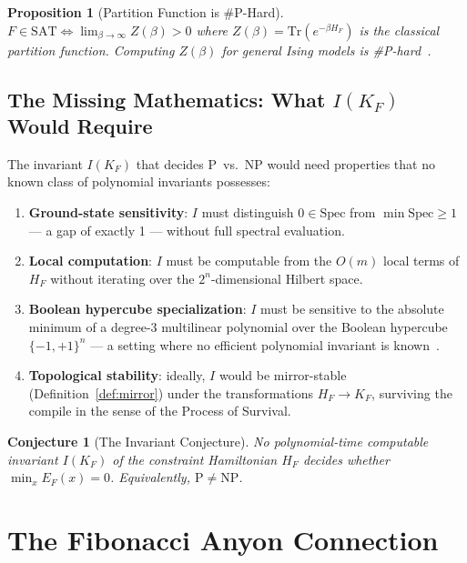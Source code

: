 \documentclass[11pt,letterpaper]{article}
\newtheorem{proposition}[theorem]{Proposition}
\newtheorem{conjecture}[theorem]{Conjecture}
\begin{document}
\begin{proposition}[Partition Function is \#P-Hard]
$F \in \mathrm{SAT} \iff \lim_{\beta \to \infty} Z(\beta) > 0$ where
$Z(\beta) = \mathrm{Tr}(e^{-\beta H_F})$ is the classical partition function.
Computing $Z(\beta)$ for general Ising models is \#P-hard~\cite{jerrum1993}.
\end{proposition}

\subsection{The Missing Mathematics: What $I(K_F)$ Would Require}

The invariant $I(K_F)$ that decides P~vs.~NP would need properties that no
known class of polynomial invariants possesses:

\begin{enumerate}
\item \textbf{Ground-state sensitivity}: $I$ must distinguish $0 \in \mathrm{Spec}$
  from $\min \mathrm{Spec} \geq 1$ --- a gap of exactly 1 --- without full
  spectral evaluation.
\item \textbf{Local computation}: $I$ must be computable from the $O(m)$
  local terms of $H_F$ without iterating over the $2^n$-dimensional Hilbert space.
\item \textbf{Boolean hypercube specialization}: $I$ must be sensitive to
  the absolute minimum of a degree-3 multilinear polynomial over the
  Boolean hypercube $\{-1,+1\}^n$ --- a setting where no efficient
  polynomial invariant is known~\cite{razborov1992}.
\item \textbf{Topological stability}: ideally, $I$ would be mirror-stable
  (Definition~\ref{def:mirror}) under the transformations $H_F \to K_F$,
  surviving the compile in the sense of the Process of Survival.
\end{enumerate}

\begin{conjecture}[The Invariant Conjecture]
No polynomial-time computable invariant $I(K_F)$ of the constraint
Hamiltonian $H_F$ decides whether $\min_x E_F(x) = 0$.  Equivalently,
$\mathrm{P} \neq \mathrm{NP}$.
\end{conjecture}

\section{The Fibonacci Anyon Connection}
\label{sec:fibonacci}
\end{document}
